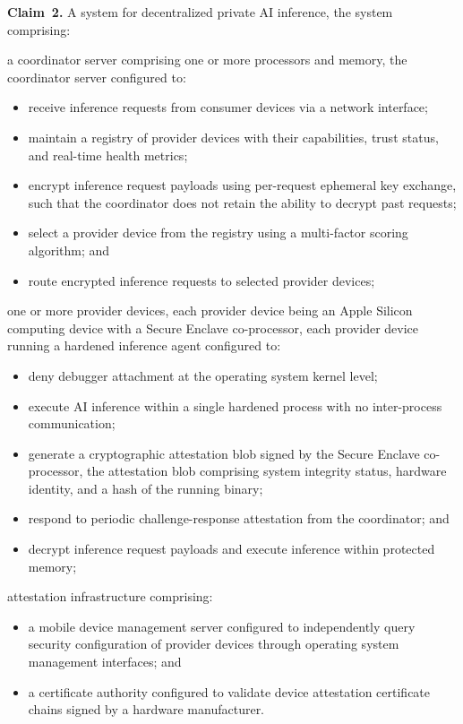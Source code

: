 \documentclass[11pt,letterpaper]{article}
\begin{document}
\textbf{Claim~2.} A system for decentralized private AI inference, the system comprising:

a coordinator server comprising one or more processors and memory, the coordinator server configured to:
\begin{itemize}[nosep]
\item receive inference requests from consumer devices via a network interface;
\item maintain a registry of provider devices with their capabilities, trust status, and real-time health metrics;
\item encrypt inference request payloads using per-request ephemeral key exchange, such that the coordinator does not retain the ability to decrypt past requests;
\item select a provider device from the registry using a multi-factor scoring algorithm; and
\item route encrypted inference requests to selected provider devices;
\end{itemize}

one or more provider devices, each provider device being an Apple Silicon computing device with a Secure Enclave co-processor, each provider device running a hardened inference agent configured to:
\begin{itemize}[nosep]
\item deny debugger attachment at the operating system kernel level;
\item execute AI inference within a single hardened process with no inter-process communication;
\item generate a cryptographic attestation blob signed by the Secure Enclave co-processor, the attestation blob comprising system integrity status, hardware identity, and a hash of the running binary;
\item respond to periodic challenge-response attestation from the coordinator; and
\item decrypt inference request payloads and execute inference within protected memory;
\end{itemize}

attestation infrastructure comprising:
\begin{itemize}[nosep]
\item a mobile device management server configured to independently query security configuration of provider devices through operating system management interfaces; and
\item a certificate authority configured to validate device attestation certificate chains signed by a hardware manufacturer.
\end{itemize}
\end{document}
